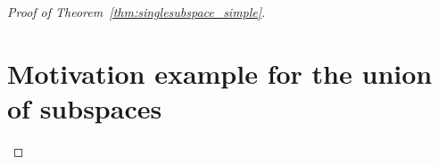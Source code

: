 \documentclass{article} %
\begin{document}
\begin{proof}[Proof of Theorem~\ref{thm:singlesubspace_simple}]
\section{Motivation example for the union of subspaces}





\end{proof}




\end{document}
